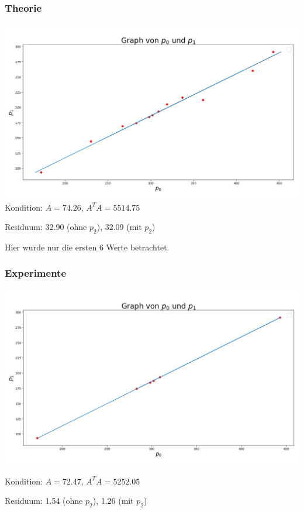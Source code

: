 \documentclass{beamer}
\begin{document}
\begin{frame}
    \frametitle{Theorie}
    \includegraphics[width=\textwidth]{plot.png}
    Kondition: \(A = 74.26\), \(A^T A = 5514.75\)

    Residuum: 32.90 (ohne \(p_2\)), 32.09 (mit \(p_2\))
\end{frame}

\begin{frame}
Hier wurde nur die ersten 6 Werte betrachtet.

\frametitle{Experimente}
\includegraphics[width=\textwidth]{plot1.png}

Kondition: $A = 72.47$, $A^T A = 5252.05$

Residuum: 1.54 (ohne $p_2$), 1.26 (mit $p_2$)
\end{frame}
\end{document}
